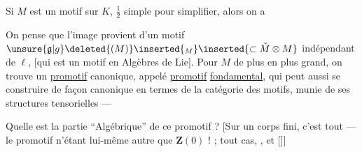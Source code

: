 Si $M$ est un motif sur $K$, $\frac12$ simple pour simplifier, alors on a

On pense que l'image provient d'un motif $\unsure{\mathfrak{g}|g}\deleted{(M)}\inserted{_{M}}\inserted{\subset\check{M}\otimes M}$ indépendant de $\ell$, [qui est un motif en Algèbres de Lie].
Pour $M$ de plus en plus grand, on trouve un \uline{promotif}  canonique, appelé \uline{promotif} \uline{fondamental}, qui peut aussi se construire de façon canonique en termes de la catégorie des motifs, munie de ses structures tensorielles ---

Quelle est la partie ``Algébrique'' de ce promotif ? [Sur un corps fini, c'est tout --- le promotif n'étant lui-même autre que $\mathbf{Z}(0)$ ! ;  tout  cas,      , et   []]

